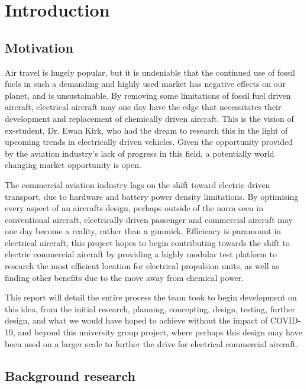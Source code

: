 \documentclass[../../main.tex]{subfiles}
\begin{document}
\chapter{Introduction} \label{chapter:introduction}

\section{Motivation} \label{sec:introduction:motivation}

Air travel is hugely popular, but it is undeniable that the continued use of fossil fuels in such a demanding and highly used market has negative effects on our planet, and is unsustainable.
By removing some limitations of fossil fuel driven aircraft, electrical aircraft may one day have the edge that necessitates their development and replacement of chemically driven aircraft.
This is the vision of ex-student, Dr. Ewan Kirk, who had the dream to research this in the light of upcoming trends in electrically driven vehicles.
Given the opportunity provided by the aviation industry’s lack of progress in this field, a potentially world changing market opportunity is open. 

The commercial aviation industry lags on the shift toward electric driven transport, due to hardware and battery power density limitations.
By optimising every aspect of an aircrafts design, perhaps outside of the norm seen in conventional aircraft, electrically driven passenger and commercial aircraft may one day become a reality, rather than a gimmick.
Efficiency is paramount in electrical aircraft, this project hopes to begin contributing towards the shift to electric commercial aircraft by providing a highly modular test platform to research the most efficient location for electrical propulsion units, as well as finding other benefits due to the move away from chemical power. 

This report will detail the entire process the team took to begin development on this idea, from the initial research, planning, concepting, design, testing, further design, and what we would have hoped to achieve without the impact of COVID-19, and beyond this university group project, where perhaps this design may have been used on a larger scale to further the drive for electrical commercial aircraft. 

\section{Background research} \label{sec:introduction:background-research}
\end{document}
